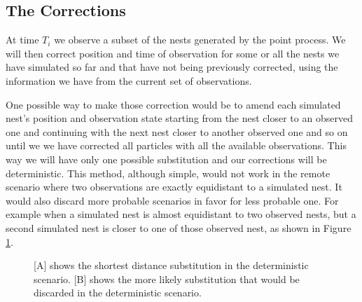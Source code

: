\documentclass[11pt,a4paper]{article}
\begin{document}
{\color{red}
\subsection{The Corrections} \label{subsec:corrections}

At time $T_i$ we observe a subset of the nests generated by the point process. We will then correct position and time of observation for some or all the nests we have simulated so far and that have not being previously corrected, using the information we have from the current set of observations.

One possible way to make those correction would be to amend each simulated nest's position and observation state starting from the nest closer to an observed one and continuing with the next nest closer to another observed one and so on until we we have corrected all particles with all the available observations. This way we will have only one possible substitution and our corrections will be deterministic. This method, although simple, would not work in the remote scenario where two observations are exactly equidistant to a simulated nest. It would also discard more probable scenarios in favor for less probable one. For example when a simulated nest is almost equidistant to two observed nests, but a second simulated nest is closer to one of those observed nest, as shown in Figure \ref{fig:1}.

\begin{figure}
\centering
\caption{[A] shows the shortest distance substitution in the deterministic scenario. [B] shows the more likely substitution that would be discarded in the deterministic scenario.}
\label{fig:1}
\end{figure}

}
\end{document}
